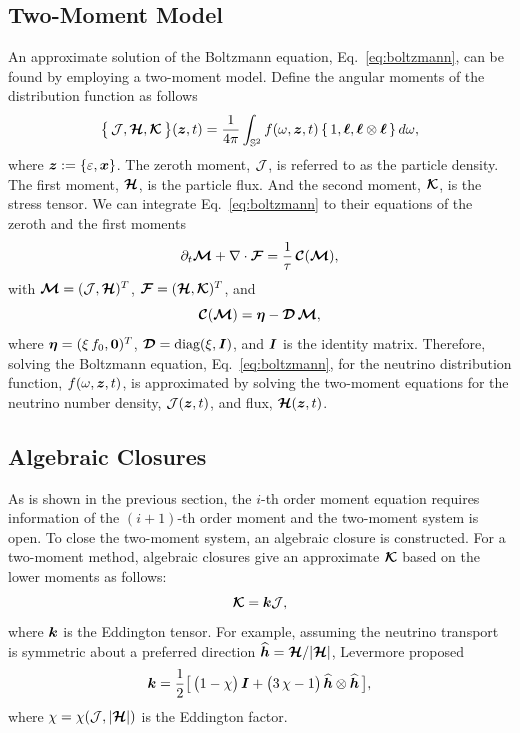 \subsection{Two-Moment Model}
An approximate solution of the Boltzmann equation, Eq.~\eqref{eq:boltzmann}, can be found by employing a two-moment model.
Define the angular moments of the distribution function as follows
\begin{equation}
  \big\{\,\mathcal{J},\boldsymbol{\mathcal{H}},\boldsymbol{\mathcal{K}}\,\big\}(\boldsymbol{z},t)
  =\frac{1}{4\pi}\int_{\mathbb{S}^{2}}f(\omega,\boldsymbol{z},t)\,\{\,1,\boldsymbol{\ell},\boldsymbol{\ell}\otimes\boldsymbol{\ell}\,\}\,d\omega,
  \label{eq:angularMoments}
\end{equation}
where $\boldsymbol{z}:=\{\varepsilon,\boldsymbol{x}\}$.
The zeroth moment, $\mathcal{J}$, is referred to as the particle density.
The first moment, $\boldsymbol{\mathcal{H}}$, is the particle flux.
And the second moment, $\boldsymbol{\mathcal{K}}$, is the stress tensor.
We can integrate Eq.~\eqref{eq:boltzmann} to their equations of the zeroth and the first moments
\begin{equation}
  \partial_{t}{\boldsymbol{\mathcal{M}}}+\nabla\cdot\boldsymbol{\mathcal{F}}=\frac{1}{\tau}\,\boldsymbol{\mathcal{C}}(\boldsymbol{\mathcal{M}}),
  \label{eq:momentEquations}
\end{equation}
with $\boldsymbol{\mathcal{M}}=(\mathcal{J},\boldsymbol{\mathcal{H}})^{T}$, $\boldsymbol{\mathcal{F}}=(\boldsymbol{\mathcal{H}},\boldsymbol{\mathcal{K}})^{T}$, and
\begin{equation}
  \boldsymbol{\mathcal{C}}(\boldsymbol{\mathcal{M}})=\boldsymbol{\eta}-\boldsymbol{\mathcal{D}}\,\boldsymbol{\mathcal{M}},
  \label{eq:collisionTermMoments}
\end{equation}
where $\boldsymbol{\eta}=(\xi\,f_{0},\boldsymbol{0})^{T}$, $\boldsymbol{\mathcal{D}}=\mbox{diag}(\xi,\boldsymbol{I})$, and
$\boldsymbol{I}$ is the identity matrix.
Therefore, solving the Boltzmann equation, Eq.~\eqref{eq:boltzmann}, for the neutrino distribution function, $f(\omega,\boldsymbol{z},t)$, is approximated by solving the two-moment equations for the neutrino number density, $\mathcal{J}(\boldsymbol{z},t)$, and flux, $\boldsymbol{\mathcal{H}}(\boldsymbol{z},t)$.

\subsection{Algebraic Closures }
As is shown in the previous section, the $i$-th order moment equation requires information of the $(i+1)$-th order moment and the two-moment system is open. 
To close the two-moment system, an algebraic closure is constructed.
For a two-moment method, algebraic closures give an approximate $\boldsymbol{\mathcal{K}}$ based on the lower moments as follows:
\begin{equation}
\boldsymbol{\mathcal{K}} = \boldsymbol{k} \mathcal{J},
\end{equation}
where $\boldsymbol{k}$ is the Eddington tensor.
For example, assuming the neutrino transport is symmetric about a preferred direction $\widehat{\boldsymbol{h}}=\boldsymbol{\mathcal{H}}/|\boldsymbol{\mathcal{H}}|$, Levermore\cite{levermore_1984} proposed
\begin{equation}
  \boldsymbol{k}=\frac{1}{2}\big[\,\big(1-\chi\big)\,\boldsymbol{I}+\big(3\,\chi-1\big)\,\widehat{\boldsymbol{h}}\otimes\widehat{\boldsymbol{h}}\,\big],
  \label{eq:eddingtonTensor}
\end{equation}
where $\chi=\chi(\mathcal{J},|\boldsymbol{\mathcal{H}}|)$ is the Eddington factor. 

